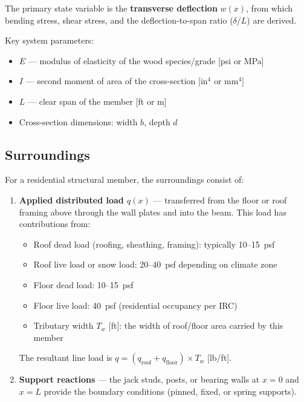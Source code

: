 The primary state variable is the \textbf{transverse deflection} $w(x)$, from which bending stress, shear stress, and the deflection-to-span ratio ($\delta/L$) are derived.

Key system parameters:
\begin{itemize}
  \item $E$ --- modulus of elasticity of the wood species/grade [psi or MPa]
  \item $I$ --- second moment of area of the cross-section [in$^4$ or mm$^4$]
  \item $L$ --- clear span of the member [ft or m]
  \item Cross-section dimensions: width $b$, depth $d$
\end{itemize}

\subsection{Surroundings}

For a residential structural member, the surroundings consist of:

\begin{enumerate}
  \item \textbf{Applied distributed load $q(x)$} --- transferred from the floor or roof framing above through the wall plates and into the beam.
  This load has contributions from:
  \begin{itemize}
    \item Roof dead load (roofing, sheathing, framing): typically 10--15~psf
    \item Roof live load or snow load: 20--40~psf depending on climate zone
    \item Floor dead load: 10--15~psf
    \item Floor live load: 40~psf (residential occupancy per IRC)
    \item Tributary width $T_w$ [ft]: the width of roof/floor area carried by this member
  \end{itemize}
  The resultant line load is $q = (q_{\text{roof}} + q_{\text{floor}}) \times T_w$ [lb/ft].

  \item \textbf{Support reactions} --- the jack studs, posts, or bearing walls at $x = 0$ and $x = L$ provide the boundary conditions (pinned, fixed, or spring supports).

\end{enumerate}

